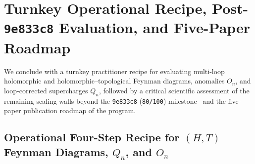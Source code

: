 \section{Turnkey Operational Recipe, Post-\texttt{9e833c8} Evaluation, and Five-Paper Roadmap}
\label{sec:conclusion}

We conclude with a turnkey practitioner recipe for evaluating multi-loop holomorphic and holomorphic--topological Feynman diagrams, anomalies $O_n$, and loop-corrected supercharges $Q_n$, followed by a critical scientific assessment of the remaining scaling walls beyond the \texttt{9e833c8} (\texttt{80/100}) milestone~\cite{Repo9e833c8} and the five-paper publication roadmap of the program.

\subsection{Operational Four-Step Recipe for \texorpdfstring{$(H,T)$}{(H,T)} Feynman Diagrams, \texorpdfstring{$Q_n$}{Q\_n}, and \texorpdfstring{$O_n$}{O\_n}}
\label{subsec:operational-recipe}

